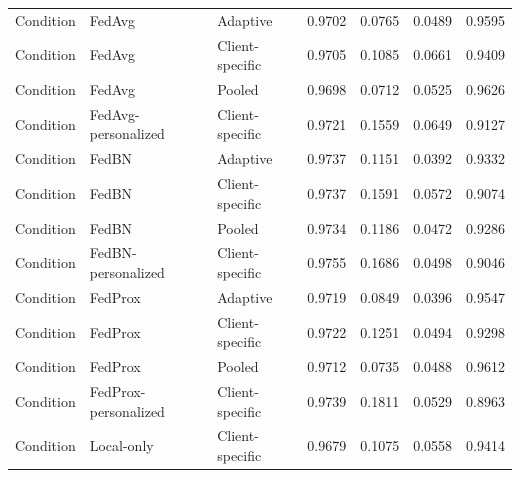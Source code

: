 \begin{table}[t]
\begin{tabularx}{\textwidth}{llXrrrr}
Condition & FedAvg & Adaptive & 0.9702 & 0.0765 & 0.0489 & 0.9595 \\
Condition & FedAvg & Client-specific & 0.9705 & 0.1085 & 0.0661 & 0.9409 \\
Condition & FedAvg & Pooled & 0.9698 & 0.0712 & 0.0525 & 0.9626 \\
Condition & FedAvg-personalized & Client-specific & 0.9721 & 0.1559 & 0.0649 & 0.9127 \\
Condition & FedBN & Adaptive & 0.9737 & 0.1151 & 0.0392 & 0.9332 \\
Condition & FedBN & Client-specific & 0.9737 & 0.1591 & 0.0572 & 0.9074 \\
Condition & FedBN & Pooled & 0.9734 & 0.1186 & 0.0472 & 0.9286 \\
Condition & FedBN-personalized & Client-specific & 0.9755 & 0.1686 & 0.0498 & 0.9046 \\
Condition & FedProx & Adaptive & 0.9719 & 0.0849 & 0.0396 & 0.9547 \\
Condition & FedProx & Client-specific & 0.9722 & 0.1251 & 0.0494 & 0.9298 \\
Condition & FedProx & Pooled & 0.9712 & 0.0735 & 0.0488 & 0.9612 \\
Condition & FedProx-personalized & Client-specific & 0.9739 & 0.1811 & 0.0529 & 0.8963 \\
Condition & Local-only & Client-specific & 0.9679 & 0.1075 & 0.0558 & 0.9414 \\
\bottomrule
\end{tabularx}
\end{table}
